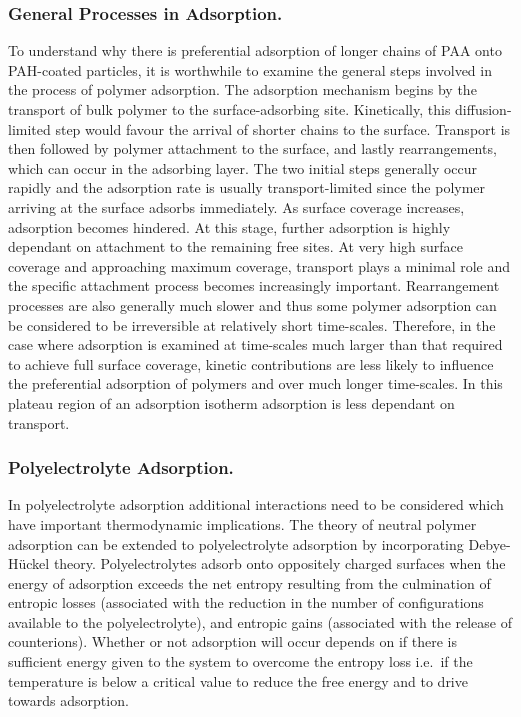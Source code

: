 \documentclass[twoside,twocolumn,9pt]{article}
\begin{document}
\subsubsection{General Processes in Adsorption.}  %
     \label{sec-res-gen}

To understand why there is preferential adsorption of longer chains of PAA onto PAH-coated particles, it is worthwhile to examine the general steps involved in the process of polymer adsorption.  The adsorption mechanism begins by the transport of bulk polymer to the surface-adsorbing site.  Kinetically, this diffusion-limited step would favour the arrival of shorter chains to the surface.  Transport is then followed by polymer attachment to the surface, and lastly rearrangements, which can occur in the adsorbing layer.  The two initial steps generally occur rapidly and the adsorption rate is usually transport-limited since the polymer arriving at the surface adsorbs immediately.\cite{Dijt1990} As surface coverage increases, adsorption becomes hindered.  At this stage, further adsorption is highly dependant on attachment to the remaining free sites.\cite{Hoogeveen1996}  At very high surface coverage and approaching maximum coverage, transport plays a minimal role and the specific attachment process becomes increasingly important.\cite{Hoogeveen1996} Rearrangement processes are also generally much slower and thus some polymer adsorption can be considered to be irreversible at relatively short time-scales.\cite{Cafe1982,Meadows1988}  Therefore, in the case where adsorption is examined at time-scales much larger than that required to achieve full surface coverage, kinetic contributions are less likely to influence the preferential adsorption of polymers and over much longer time-scales.  In this plateau region of an adsorption isotherm adsorption is less dependant on transport.\cite{Hoogeveen1996}



\subsubsection{Polyelectrolyte Adsorption.}    %
    \label{sec-polyads}

In polyelectrolyte adsorption additional interactions need to be considered which have important thermodynamic implications. The theory of neutral polymer adsorption can be extended to polyelectrolyte adsorption by incorporating Debye-H\"uckel theory.\cite{Chatellier1996}  Polyelectrolytes adsorb onto oppositely charged surfaces when the energy of adsorption exceeds the net entropy resulting from the culmination of entropic losses (associated with the reduction in the number of configurations available to the polyelectrolyte), and entropic gains (associated with the release of counterions).  Whether or not adsorption will occur depends on if there is sufficient energy given to the system to overcome the entropy loss i.e.\ if the temperature is below a critical value to reduce the free energy and to drive towards adsorption.
\end{document}
